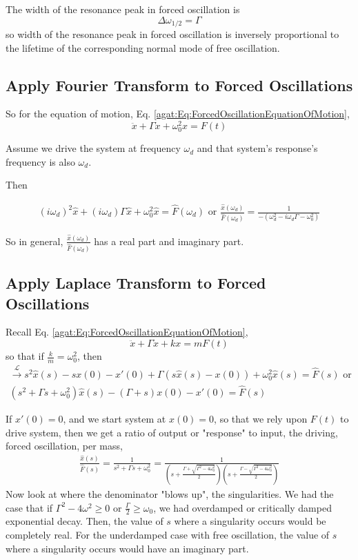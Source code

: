 The width of the resonance peak in forced oscillation is 
\[
\Delta \omega_{1/2} = \Gamma
\]
so width of the resonance peak in forced oscillation is inversely proportional to the lifetime of the corresponding normal mode of free oscillation.

\subsection{Apply Fourier Transform to Forced Oscillations}

So for the equation of motion, Eq. \ref{agat:Eq:ForcedOscillationEquationOfMotion},
\[
\ddot{x} + \Gamma \dot{x} + \omega_0^2 x = F(t)
\]

Assume we drive the system at frequency $\omega_d$ and that system's response's frequency is also $\omega_d$.

Then

\[
\begin{gathered}
	(i\omega_d)^2 \widehat{x} + (i\omega_d) \Gamma \widehat{x} + \omega_0^2 \widehat{x} = \widehat{F}(\omega_d) \text{ or } \frac{ \widehat{x}(\omega_d) }{ \widehat{F}(\omega_d) } = \frac{1}{ - (\omega_d^2 - i \omega_d \Gamma - \omega_0^2) }
\end{gathered}
\]

So in general, $\frac{ \widehat{x}(\omega_d) }{ \widehat{F}(\omega_d) }$ has a real part and imaginary part.


\subsection{Apply Laplace Transform to Forced Oscillations}

Recall Eq. \ref{agat:Eq:ForcedOscillationEquationOfMotion},
\[
\ddot{x} + \Gamma \dot{x} + k x = mF(t)
\]
so that if $\frac{k}{m} = \omega_0^2$, then
\[
\begin{gathered}
	\xrightarrow{ \mathcal{L}} s^2 \widehat{x}(s) - s x(0) - x'(0) + \Gamma (s\widehat{x}(s) - x(0)) + \omega_0^2 \widehat{x}(s) = \widehat{F}(s) \text{ or } \\
	(s^2 + \Gamma s + \omega_0^2) \widehat{x}(s) - (\Gamma + s) x(0) - x'(0) = \widehat{F}(s)
\end{gathered}
\]

If $x'(0) = 0$, and we start system at $x(0) =0$, so that we rely upon $F(t)$ to drive system, then we get a ratio of output or "response" to input, the driving, forced oscillation, per mass,
\[
\begin{gathered}
	\frac{ \widehat{x}(s) }{ \widehat{F}(s) } = \frac{1}{ s^2 + \Gamma s + \omega_0^2 } = \frac{1}{ \left( s + \frac{ \Gamma + \sqrt{ \Gamma^2 - 4 \omega_0^2 } }{ 2 } \right) \left( s + \frac{ \Gamma - \sqrt{ \Gamma^2 - 4 \omega_0^2 } }{ 2} \right) }
\end{gathered}
\]
Now look at where the denominator "blows up", the singularities. We had the case that if $\Gamma^2 - 4\omega^2 \geq 0 $ or $\frac{\Gamma}{2} \geq \omega_0$, we had overdamped or critically damped exponential decay. Then, the value of $s$ where a singularity occurs would be completely real. For the underdamped case with free oscillation, the value of $s$ where a singularity occurs would have an imaginary part.

